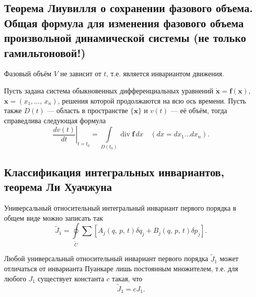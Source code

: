 \documentclass[a4paper,12pt]{article}
\begin{document}
\subsection{Теорема Лиувилля о сохранении фазового объема. Общая формула для
изменения фазового объема произвольной динамической системы (не только
гамильтоновой!)}
\begin{thm}[Лиувилля]
	Фазовый объём $V$ не зависит от $t$, т.\:е. является инвариантом
	движения.
\end{thm}
Пусть задана система обыкновенных дифференциальных уравнений 
$\dot{\mathbf{x}}=\mathbf{f}(\mathbf{x})$, $\mathbf{x}=(x_1,\ldots,\,x_n)$,
решения которой продолжаются на всю ось времени. Пусть также $D(t)$ ---
область в пространстве $\{\mathbf{x}\}$ и $v(t)$ --- её  объём, тогда
справедлива  следующая формула
\[
	\left.\frac{dv(t)}{dt}\right|_{t=t_0}= \int\limits_{D(t_0)}
		\operatorname{div}
		\mathbf{f}\,dx  \quad(dx=dx_1 \ldots dx_n)
.\] 

\subsection{Классификация интегральных инвариантов, теорема Ли Хуачжуна}
Универсальный относительный интегральный инвариант первого порядка в общем
виде можно записать так
\[
	\tilde{J}_1=\oint\limits_{\tilde{C}}\sum\left[ A_j(q,\,p,\,t)\delta q_j
	+B_j(q,\,p,\,t)\delta p_j\right] 
.\] 
\begin{thm}
	Любой универсальный относительный инвариант первого порядка $\tilde{J}_1$
	может отличаться от инварианта Пуанкаре лишь постоянным множителем,
	 т.\:е. для любого $J_1$ существует константа $c$ такая, что
	 \[
		 \tilde{J}_1=cJ_1
	 .\] 
\end{thm}
\end{document}

